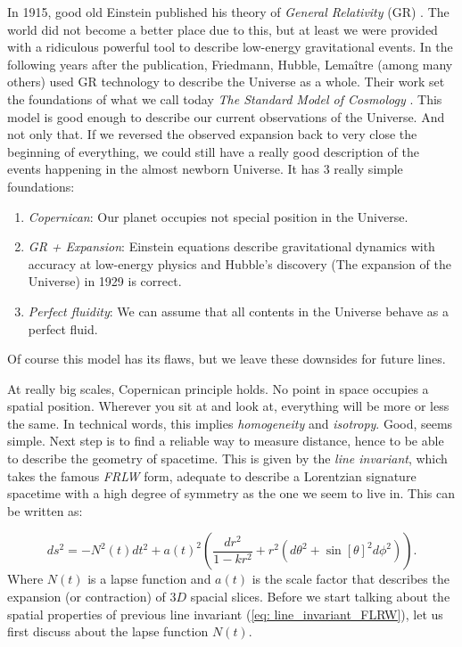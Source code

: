 \documentclass[11pt, a4paper]{article} %
\begin{document}
In 1915, good old Einstein published his theory of \textit{General Relativity} (GR) \cite{}. The world did not become a better place due to this, but at least we were provided with a ridiculous powerful tool to describe low-energy gravitational events. In the following years after the publication, Friedmann, Hubble, Lema\^itre \cite{} (among many others) used GR technology to describe the Universe as a whole. Their work set the foundations of what we call today \textit{The Standard Model of Cosmology} \cite{}. This model is good enough to describe our current observations of the Universe. And not only that. If we reversed the observed expansion back to very close the beginning of everything, we could still have a really good description of the events happening in the almost newborn Universe. It has 3 really simple foundations:

\begin{enumerate}
	\item \textit{Copernican}: Our planet occupies not special position in the Universe.
	\item \textit{GR + Expansion}: Einstein equations describe gravitational dynamics with accuracy at low-energy physics and Hubble's discovery (The expansion of the Universe) in 1929 is correct.
	\item \textit{Perfect fluidity}: We can assume that all contents in the Universe behave as a perfect fluid.
\end{enumerate}

Of course this model has its flaws, but we leave these downsides for future lines.

At really big scales, Copernican principle holds. No point in space occupies a spatial position. Wherever you sit at and look at, everything will be more or less the same. In technical words, this implies \textit{homogeneity} and \textit{isotropy}. Good, seems simple. Next step is to find a reliable way to measure distance, hence to be able to describe the geometry of spacetime. This is given by the \textit{line invariant}, which takes the famous \textit{FRLW} form, adequate to describe a Lorentzian signature spacetime with a high degree of symmetry as the one we seem to live in. This can be written as:


\begin{equation}\label{eq: line_invariant_FLRW}
	ds^{2} = - N^{2}(t) dt^{2} + a(t)^2 \left(\frac{dr^{2}}{1- k r^{2}}+ r^{2} \left(d\theta^{2} + \sin[\theta]^{2} d\phi^{2}\right)\right).
\end{equation}
Where $N(t)$ is a lapse function and $a(t)$ is the scale factor that describes the expansion (or contraction) of $3D$ spacial slices. Before we start talking about the spatial properties of previous line invariant (\ref{eq: line_invariant_FLRW}), let us first discuss about the lapse function $N(t)$. 
\end{document}
